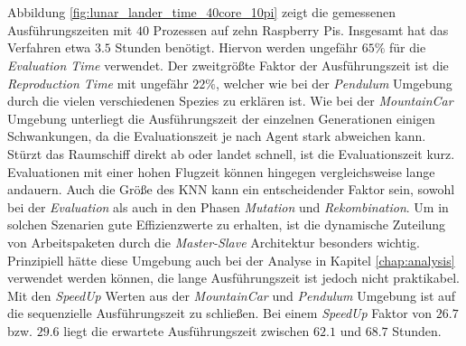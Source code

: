 \\\\
Abbildung \ref{fig:lunar_lander_time_40core_10pi} zeigt die gemessenen Ausführungszeiten mit $40$ Prozessen auf zehn Raspberry Pis. Insgesamt hat das Verfahren etwa $3.5$ Stunden benötigt. Hiervon werden ungefähr $65\%$ für die \emph{Evaluation Time} verwendet. Der zweitgrößte Faktor der Ausführungszeit ist die \emph{Reproduction Time} mit ungefähr $22\%$, welcher wie bei der \emph{Pendulum} Umgebung durch die vielen verschiedenen Spezies zu erklären ist. Wie bei der \emph{MountainCar} Umgebung unterliegt die Ausführungszeit der einzelnen Generationen einigen Schwankungen, da die Evaluationszeit je nach Agent stark abweichen kann. Stürzt das Raumschiff direkt ab oder landet schnell, ist die Evaluationszeit kurz. Evaluationen mit einer hohen Flugzeit können hingegen vergleichsweise lange andauern. Auch die Größe des \ac{KNN} kann ein entscheidender Faktor sein, sowohl bei der \emph{Evaluation} als auch in den Phasen \emph{Mutation} und \emph{Rekombination}. Um in solchen Szenarien gute Effizienzwerte zu erhalten, ist die dynamische Zuteilung von Arbeitspaketen durch die \emph{Master-Slave} Architektur besonders wichtig. Prinzipiell hätte diese Umgebung auch bei der Analyse in Kapitel \ref{chap:analysis} verwendet werden können, die lange Ausführungszeit ist jedoch nicht praktikabel. Mit den \emph{SpeedUp} Werten aus der \emph{MountainCar} und \emph{Pendulum} Umgebung ist auf die sequenzielle Ausführungszeit zu schließen. Bei einem \emph{SpeedUp} Faktor von $26.7$ bzw. $29.6$ liegt die erwartete Ausführungszeit zwischen $62.1$ und $68.7$ Stunden. 